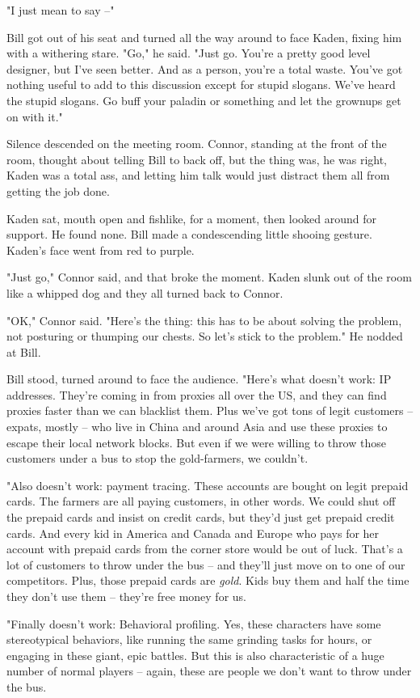 "I just mean to say --"

Bill got out of his seat and turned all the way around to face
Kaden, fixing him with a withering stare. "Go," he said. "Just go.
You're a pretty good level designer, but I've seen better. And as a
person, you're a total waste. You've got nothing useful to add to
this discussion except for stupid slogans. We've heard the stupid
slogans. Go buff your paladin or something and let the grownups get
on with it."

Silence descended on the meeting room. Connor, standing at the
front of the room, thought about telling Bill to back off, but the
thing was, he was right, Kaden was a total ass, and letting him
talk would just distract them all from getting the job done.

Kaden sat, mouth open and fishlike, for a moment, then looked
around for support. He found none. Bill made a condescending little
shooing gesture. Kaden's face went from red to purple.

"Just go," Connor said, and that broke the moment. Kaden slunk out
of the room like a whipped dog and they all turned back to Connor.

"OK," Connor said. "Here's the thing: this has to be about solving
the problem, not posturing or thumping our chests. So let's stick
to the problem." He nodded at Bill.

Bill stood, turned around to face the audience. "Here's what
doesn't work: IP addresses. They're coming in from proxies all over
the US, and they can find proxies faster than we can blacklist
them. Plus we've got tons of legit customers -- expats, mostly --
who live in China and around Asia and use these proxies to escape
their local network blocks. But even if we were willing to throw
those customers under a bus to stop the gold-farmers, we couldn't.

"Also doesn't work: payment tracing. These accounts are bought on
legit prepaid cards. The farmers are all paying customers, in other
words. We could shut off the prepaid cards and insist on credit
cards, but they'd just get prepaid credit cards. And every kid in
America and Canada and Europe who pays for her account with prepaid
cards from the corner store would be out of luck. That's a lot of
customers to throw under the bus -- and they'll just move on to one
of our competitors. Plus, those prepaid cards are \emph{gold}. Kids
buy them and half the time they don't use them -- they're free
money for us.

"Finally doesn't work: Behavioral profiling. Yes, these characters
have some stereotypical behaviors, like running the same grinding
tasks for hours, or engaging in these giant, epic battles. But this
is also characteristic of a huge number of normal players -- again,
these are people we don't want to throw under the bus.


